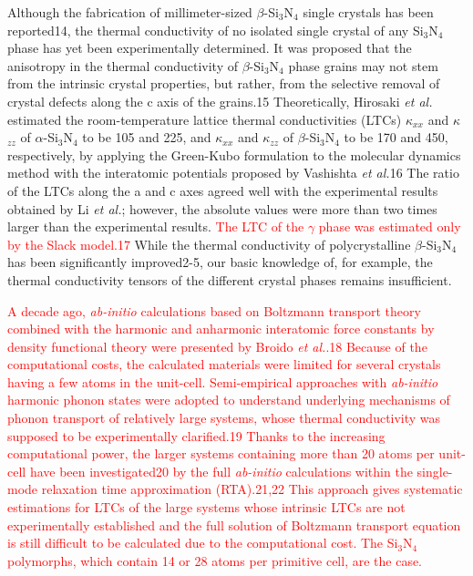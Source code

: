 \documentclass[twocolumn,amsmath,amssymb,a4paper,prb,superscriptaddress,floatfix]{revtex4-1}
\begin{document}
Although the fabrication of millimeter-sized $\beta$-Si$_3$N$_4$ single
crystals has been reported14, the thermal conductivity of no isolated
single crystal of any Si$_3$N$_4$ phase has yet been experimentally
determined. It was proposed that the anisotropy in the thermal
conductivity of $\beta$-Si$_3$N$_4$ phase grains may not stem from the
intrinsic crystal properties, but rather, from the selective removal of
crystal defects along the c axis of the grains.15 Theoretically,
Hirosaki {\it et al.} estimated the room-temperature lattice thermal
conductivities (LTCs) $\kappa$$_{xx}$ and $\kappa$$_{zz}$ of
$\alpha$-Si$_3$N$_4$ to be 105 and 225, and $\kappa$$_{xx}$ and
$\kappa$$_{zz}$ of $\beta$-Si$_3$N$_4$ to be 170 and 450, respectively,
by applying the Green-Kubo formulation to the molecular dynamics method
with the interatomic potentials proposed by Vashishta {\it et al.}16 The
ratio of the LTCs along the a and c axes agreed well with the
experimental results obtained by Li {\it et al.}; however, the absolute
values were more than two times larger than the experimental results.
%
\textcolor{red}{The LTC of the $\gamma$ phase was estimated only by the
Slack model.17}
%
While the thermal conductivity of polycrystalline $\beta$-Si$_3$N$_4$
has been significantly improved2-5, our basic knowledge of, for example,
the thermal conductivity tensors of the different crystal phases remains
insufficient.

\textcolor{red}{ A decade ago, {\it ab-initio} calculations based on
Boltzmann transport theory combined with the harmonic and anharmonic
interatomic force constants by density functional theory were presented
by Broido {\it et al.}.18 Because of the computational costs, the
calculated materials were limited for several crystals having a few
atoms in the unit-cell. Semi-empirical approaches with {\it ab-initio}
harmonic phonon states were adopted to understand underlying mechanisms
of phonon transport of relatively large systems, whose thermal
conductivity was supposed to be experimentally clarified.19 Thanks to
the increasing computational power, the larger systems containing more
than 20 atoms per unit-cell have been investigated20 by the full {\it
ab-initio} calculations within the single-mode relaxation time
approximation (RTA).21,22 This approach gives systematic estimations
for LTCs of the large systems whose intrinsic LTCs are not
experimentally established and the full solution of Boltzmann transport
equation is still difficult to be calculated due to the computational
cost. The Si$_3$N$_4$ polymorphs, which contain 14 or 28 atoms per
primitive cell, are the case.}
\end{document}
